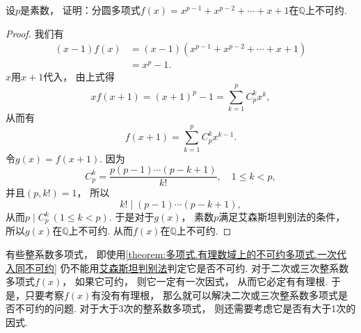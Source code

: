 \begin{example}
设\(p\)是素数，
证明：分圆多项式\(f(x)=x^{p-1}+x^{p-2}+\dotsb+x+1\)在\(\mathbb{Q}\)上不可约.
\begin{proof}
我们有\begin{align*}
	(x-1) f(x)
	&= (x-1)(x^{p-1}+x^{p-2}+\dotsb+x+1) \\
	&= x^p-1.
\end{align*}
\(x\)用\(x+1\)代入，
由上式得\begin{equation*}
	x f(x+1)
	=(x+1)^p-1
	=\sum_{k=1}^p C_p^k x^k,
\end{equation*}
从而有\begin{equation*}
	f(x+1)
	=\sum_{k=1}^p C_p^k x^{k-1}.
\end{equation*}
令\(g(x)=f(x+1)\).
因为\begin{equation*}
	C_p^k
	=\frac{p(p-1)\dotsm(p-k+1)}{k!},
	\quad1\leq k<p,
\end{equation*}
并且\((p,k!)=1\)，
所以\begin{equation*}
	k! \mid (p-1)\dotsm(p-k+1),
\end{equation*}
从而\(p \mid C_p^k\ (1\leq k<p)\).
于是对于\(g(x)\)，
素数\(p\)满足艾森斯坦判别法的条件，
所以\(g(x)\)在\(\mathbb{Q}\)上不可约.
从而\(f(x)\)在\(\mathbb{Q}\)上不可约.
\end{proof}
\end{example}

有些整系数多项式，
即使用\cref{theorem:多项式.有理数域上的不可约多项式.一次代入同不可约}
仍不能用\hyperref[theorem:多项式.有理数域上的不可约多项式.艾森斯坦判别法]{艾森斯坦判别法}判定它是否不可约.
对于二次或三次整系数多项式\(f(x)\)，
如果它可约，
则它一定有一次因式，
从而它必定有有理根.
于是，只要考察\(f(x)\)有没有有理根，
那么就可以解决二次或三次整系数多项式是否不可约的问题.
对于大于3次的整系数多项式，
则还需要考虑它是否有大于1次的因式.
